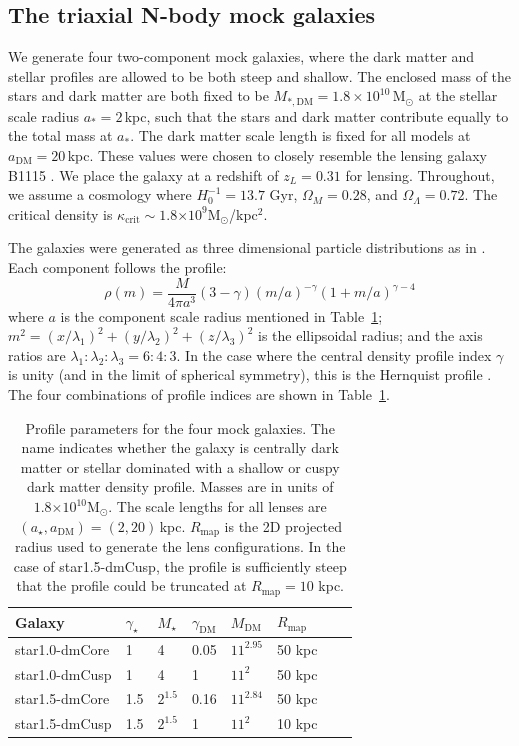 \documentclass[galley,usenatbib]{mn2e}
\newcommand{\Rmap}{\ensuremath{R_\mathrm{map}}}
\newcommand{\Msun}{\ensuremath{\mathrm{M}_\odot}}
\newcommand{\tabref}[1] {Table~\ref{#1}}
\newcommand{\e}[1]{\ensuremath{\times 10^{#1}}}
\newcommand{\mockAA}{{\sc star1.0-dmCore}}
\newcommand{\mockAC}{{\sc star1.0-dmCusp}}
\newcommand{\mockBB}{{\sc star1.5-dmCore}}
\newcommand{\mockBC}{{\sc star1.5-dmCusp}}
\begin{document}
\subsection{The triaxial N-body mock galaxies}

We generate four two-component mock galaxies, where the dark matter and stellar
profiles are allowed to be both steep and shallow.  
The enclosed mass of the stars and dark matter are both fixed to be 
$M_{*,\mathrm{DM}} = 1.8 \times 10^{10}$\,M$_\odot$ at the stellar scale radius 
$a_* = 2$\,kpc, such that the stars and dark matter contribute equally to the total
mass at $a_*$. The dark matter scale length is fixed for all models at $a_\mathrm{DM}
= 20$\,kpc.
These
values were chosen to closely resemble the lensing galaxy B1115 \citep{1980Natur.285..641W}. We place the galaxy at
a redshift of $z_L = 0.31$ for lensing.  Throughout, we assume a cosmology
where $H_0^{-1}=13.7$ Gyr, $\Omega_M=0.28$, and $\Omega_\Lambda=0.72$. The
critical density is $\kappa_\mathrm{crit}\sim 1.8\e{9}$\Msun/kpc$^2$.

The galaxies were generated as three dimensional particle distributions as in
\citet{2009MNRAS.395.1079D}. Each component follows the profile:
%
\begin{equation} 
  \rho(m) = \frac{M}{4\pi a^3}(3-\gamma){(m/a)^{-\gamma}(1 + m/a)^{\gamma-4}} 
  \label{Dehnen profile} 
\end{equation} 
%
where $a$ is the component scale radius mentioned in \tabref{mock galaxy params};
$m^2 = (x/\lambda_1)^2 + (y/\lambda_2)^2 + (z/\lambda_3)^2$ is the ellipsoidal radius; and the axis
ratios are $\lambda_1:\lambda_2:\lambda_3 = 6:4:3$.
In the case where the central density profile index
$\gamma$ is unity (and in the limit of spherical symmetry), this is the Hernquist
profile \citep{1990ApJ...356..359H}.  The four combinations of profile indices
are shown in \tabref{mock galaxy params}.

\begin{table}
\begin{tabular}{llllllll}
Galaxy & $\gamma_\star$ & $M_\star$ & $\gamma_\mathrm{DM}$ & $M_\mathrm{DM}$ & $\Rmap$ \\
\hline
\mockAA & 1 & 4 & 0.05 & $11^{2.95}$ & 50 kpc\\ %
\mockAC & 1 & 4 & 1 & $11^2$ & 50 kpc \\ %
\mockBB & 1.5 & $2^{1.5}$ & 0.16 & $11^{2.84}$ & 50 kpc \\ %
\mockBC & 1.5 & $2^{1.5}$ & 1 & $11^2$ & 10 kpc %
\end{tabular}
\caption{Profile parameters for the four mock galaxies. The name indicates whether 
  the galaxy is centrally dark matter or stellar dominated with a shallow or cuspy 
  dark matter density profile.  Masses are in units of
  $1.8\e{10}\Msun$. The scale lengths for all lenses are
  $(a_\star,a_\mathrm{DM})=(2,20)$\,kpc. $\Rmap$ is the 2D projected radius
used to generate the lens configurations. In the case of \mockBC, the profile is 
sufficiently steep that the profile could be truncated at $\Rmap = 10$ kpc.}
\label{mock galaxy params}
\end{table}
\end{document}
